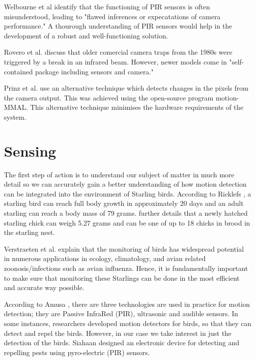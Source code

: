 \documentclass[class=report,11pt,crop=false]{standalone}
\begin{document}
Welbourne et al \cite{welbourne2016how} identify that the functioning of PIR sensors is often misunderstood, leading to "flawed inferences or expecatations of camera performance." A thourough understanding of PIR sensors would help in the development of a robust and well-functioning solution.

Rovero et al. \cite{rovero2013which} discuss that older comercial camera traps from the 1980s were triggered by a break in an infrared beam. However, newer models come in "self-contained package including sensors and camera." %

Prinz et al. \cite{prinz2016a} use an alternative technique which detects changes in the pixels from the camera output. This was achieved using the open-source program motion-MMAL. This alternative technique minimises the hardware requirements of the system.


\section{Sensing}


The first step of action is to understand our subject of matter in much more detail so we can accurately gain a better understanding of how motion detection can be integrated into the environment of Starling birds. According to Ricklefs \cite{ricklefs1968patterns}, a starling bird can reach full body growth in approximately 20 days and an adult starling can reach a body mass of 79 grams. \cite{ricklefs1968patterns} further details that a newly hatched starling chick can weigh 5.27 grams and can be one of up to 18 chicks in brood in the starling nest. 

Verstraeten et al. \cite{verstraeten2010webcams} explain that the monitoring of birds has widespread potential in numerous applications in ecology, climatology, and avian related zoonosis/infections such as avian influenza. Hence, it is fundamentally important to make sure that monitoring these Starlings can be done in the most efficient and accurate way possible.

According to Amusa \cite{amusa2015pyro}, there are three technologies are used in practice for motion detection; they are Passive InfraRed (PIR), ultrasonic and audible sensors. In some instances, researchers developed motion detectors for birds, so that they can detect and repel the birds. However, in our case we take interest in just the detection of the birds. Siahaan \cite{siahaan2017design} designed an electronic device for detecting and repelling pests using pyro-electric (PIR) sensors.
\end{document}
